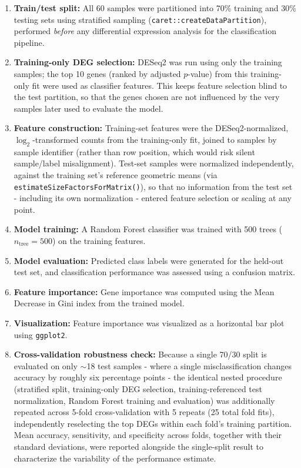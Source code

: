 \documentclass[12pt]{article}
\begin{document}
\begin{enumerate}
  \item \textbf{Train/test split:} All 60 samples were partitioned into 70\%
        training and 30\% testing sets using stratified sampling
        (\texttt{caret::createDataPartition}), performed \emph{before} any
        differential expression analysis for the classification pipeline.
  \item \textbf{Training-only DEG selection:} DESeq2 was run using only the
        training samples; the top 10 genes (ranked by adjusted $p$-value)
        from this training-only fit were used as classifier features. This
        keeps feature selection blind to the test partition, so that the
        genes chosen are not influenced by the very samples later used to
        evaluate the model.
  \item \textbf{Feature construction:} Training-set features were the
        DESeq2-normalized, $\log_2$-transformed counts from the
        training-only fit, joined to samples by sample identifier (rather
        than row position, which would risk silent sample/label
        misalignment). Test-set samples were normalized independently,
        against the training set's reference geometric means
        (via \texttt{estimateSizeFactorsForMatrix()}), so that no
        information from the test set - including its own normalization - entered feature selection or scaling at any point.
  \item \textbf{Model training:} A Random Forest classifier was trained with
        500 trees ($n_{\text{tree}} = 500$) on the training features.
  \item \textbf{Model evaluation:} Predicted class labels were generated for
        the held-out test set, and classification performance was assessed
        using a confusion matrix.
  \item \textbf{Feature importance:} Gene importance was computed using the
        Mean Decrease in Gini index from the trained model.
  \item \textbf{Visualization:} Feature importance was visualized as a
        horizontal bar plot using \texttt{ggplot2}.
  \item \textbf{Cross-validation robustness check:} Because a single 70/30
        split is evaluated on only $\sim$18 test samples - where a single misclassification changes accuracy by roughly six percentage points - the identical nested procedure (stratified split, training-only DEG selection, training-referenced test normalization, Random Forest training and evaluation) was additionally repeated across
        5-fold cross-validation with 5 repeats (25 total fold fits), independently reselecting the top DEGs within each fold's training partition. Mean accuracy, sensitivity, and specificity across folds, together with their standard deviations, were reported alongside the single-split result to characterize the variability of the
        performance estimate.
\end{enumerate}
\end{document}
